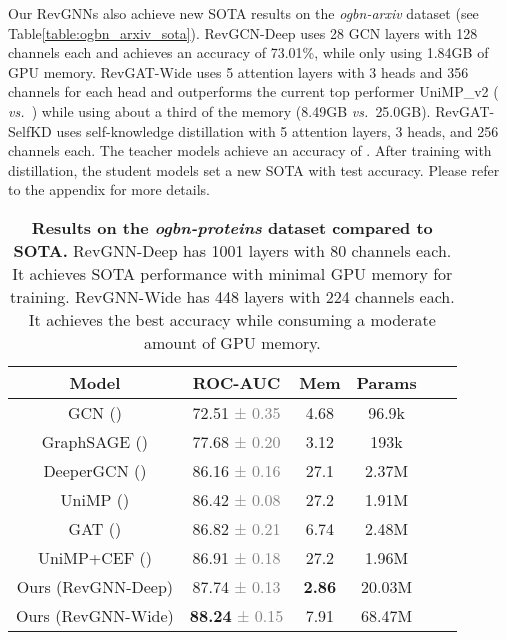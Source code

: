 \documentclass{article}
\newcommand{\vs}{\emph{vs.~}}
\newcommand{\tblLabel}{Table\xspace}
\begin{document}
Our RevGNNs also achieve new SOTA results on the \emph{ogbn-arxiv} dataset (see \tblLabel \ref{table:ogbn_arxiv_sota}). RevGCN-Deep uses 28 GCN \citep{kipf2017semi} layers with 128 channels each and achieves an accuracy of 73.01\%, while  only using 1.84GB of GPU memory.
RevGAT-Wide uses 5 attention layers with 3 heads and 356 channels for each head and outperforms the current top performer UniMP\_v2 \citep{shi2020masked} ( \vs ) while using about a third of the memory (8.49GB \vs 25.0GB). RevGAT-SelfKD uses self-knowledge distillation \citep{Zhang2019be} with 5 attention layers, 3 heads, and 256 channels each. The teacher models achieve an accuracy of . After training with distillation, the student models set a new SOTA with  test accuracy. Please refer to the appendix for more details.

\begin{table}[t]
\vspace{-8pt}
\centering
\setlength{\tabcolsep}{1pt}
\caption{\textbf{Results on the \emph{ogbn-proteins} dataset compared to SOTA.} RevGNN-Deep has 1001 layers with 80 channels each. It achieves SOTA performance with minimal GPU memory for training. RevGNN-Wide has 448 layers with 224 channels each. It achieves the best accuracy while consuming a moderate amount of GPU memory.}
\vspace{2pt}
\begin{tabular}{cccccc}
\toprule
  \label{table:ogbn_proteins_sota}
  \centering
Model & ROC-AUC 
& Mem 
& Params \\
\midrule
GCN (\citeauthor{kipf2017semi}) & 72.51 \textcolor{gray}{\small{± 0.35}} & 4.68 
& 96.9k \\
GraphSAGE (\citeauthor{hamilton2017inductive}) & 77.68 \textcolor{gray}{\small{± 0.20}} & 3.12 
& 193k \\
DeeperGCN (\citeauthor{li2020deepergcn}) & 86.16 \textcolor{gray}{\small{± 0.16}} & 27.1
& 2.37M \\
UniMP (\citeauthor{shi2020masked}) & 86.42 \textcolor{gray}{\small{± 0.08}} & 27.2
& 1.91M \\
GAT (\citeauthor{veli2018gat}) & 86.82 \textcolor{gray}{\small{± 0.21}} & 6.74
& 2.48M \\
UniMP+CEF (\citeauthor{shi2020masked}) & 86.91 \textcolor{gray}{\small{± 0.18}} 
& 27.2
& 1.96M \\
\midrule
Ours (RevGNN-Deep)& 87.74 \textcolor{gray}{\small{± 0.13}} & \textbf{2.86} & 20.03M
\\
Ours (RevGNN-Wide) & \textbf{88.24} \textcolor{gray}{\small{± 0.15}} & 7.91 & 68.47M 
\\
\bottomrule
\end{tabular}
\end{table}
\end{document}
